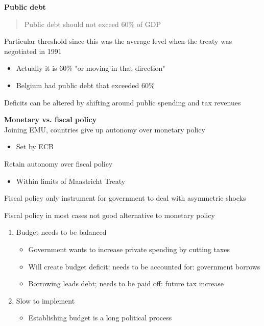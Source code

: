 \documentclass{beamer}
\begin{document}
\begin{frame}
  \textbf{Public debt} 
  \begin{quote}
    Public debt should not exceed 60\% of GDP
  \end{quote}
  Particular threshold since this was the average level when the treaty was negotiated in 1991
  \begin{itemize}
    \item Actually it is 60\% "or moving in that direction"
    \item Belgium had public debt that exceeded 60\%
  \end{itemize}
  \medskip
  Deficits can be altered by shifting around public spending and tax revenues
\end{frame}

\begin{frame}
  \textbf{Monetary vs. fiscal policy}\\
  \medskip
  Joining EMU, countries give up autonomy over monetary policy
  \begin{itemize}
    \item Set by ECB
  \end{itemize}
  \medskip
  Retain autonomy over fiscal policy
  \begin{itemize}
    \item Within limits of Maastricht Treaty
  \end{itemize}
  \medskip
  Fiscal policy only instrument for government to deal with asymmetric shocks
\end{frame}

\begin{frame}
  Fiscal policy in most cases not good alternative to monetary policy
\begin{enumerate}
  \item Budget needs to be balanced
  \begin{itemize}
    \item Government wants to increase private spending by cutting taxes
    \item Will create budget deficit; needs to be accounted for: government borrows
    \item Borrowing leads debt; needs to be paid off: future tax increase
  \end{itemize}
  \medskip
  \item Slow to implement
  \begin{itemize}
    \item Establishing budget is a long political process
  \end{itemize}
\end{enumerate}
\end{frame}
\end{document}
